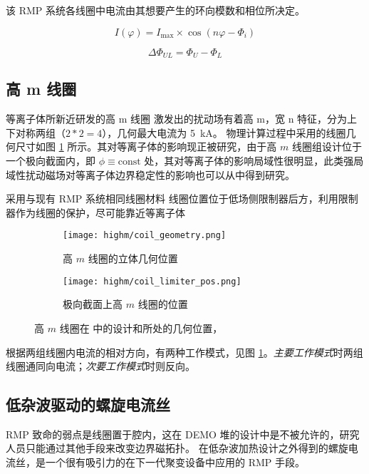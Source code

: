 该 RMP 系统各线圈中电流由其想要产生的环向模数和相位所决定。

\begin{equation}
I(\varphi)=I_{\max } \times \cos \left(n \varphi-\Phi_{i}\right)
\end{equation}

\begin{equation}
\Delta \Phi_{UL} = \Phi_U - \Phi_L
\end{equation}


\subsection{高 m 线圈}
等离子体所新近研发的高 m 线圈  激发出的扰动场有着高 m，宽 n 特征，分为上下对称两组（$2*2=4$），几何最大电流为 \SI{5}{\kilo\ampere}。 
物理计算过程中采用的线圈几何尺寸如图 \ref{fig:highm-pos} 所示。其对等离子体的影响现正被研究，由于高 $m$ 线圈组设计位于一个极向截面内，即 $\phi\equiv \text{const}$ 处，其对等离子体的影响局域性很明显，此类强局域性扰动磁场对等离子体边界稳定性的影响也可以从中得到研究。

采用与现有 RMP 系统相同线圈材料 线圈位置位于低场侧限制器后方，利用限制器作为线圈的保护，尽可能靠近等离子体 


\begin{figure}[htbp]
    \centering%
    \begin{subfigure}{0.45\textwidth}
      \texttt{[image: highm/coil\_geometry.png]}
      \caption{高 $m$ 线圈的立体几何位置}
    \end{subfigure}
    \begin{subfigure}{0.45\textwidth}
      \texttt{[image: highm/coil\_limiter\_pos.png]}
      \caption{极向截面上高 $m$ 线圈的位置}
    \end{subfigure}
    \caption{高 $m$ 线圈在 \east 中的设计和所处的几何位置，\cite{zhang_highm}}
    \label{fig:highm-pos}
  \end{figure}

根据两组线圈内电流的相对方向，有两种工作模式，见图 \ref{fig:highm-pos}。\textit{主要工作模式}时两组线圈通同向电流；\textit{次要工作模式}时则反向。








\subsection{低杂波驱动的螺旋电流丝}
RMP 致命的弱点是线圈置于腔内，这在 DEMO 堆的设计中是不被允许的，研究人员只能通过其他手段来改变边界磁拓扑。 在低杂波加热设计之外得到的螺旋电流丝，是一个很有吸引力的在下一代聚变设备中应用的 RMP 手段。


